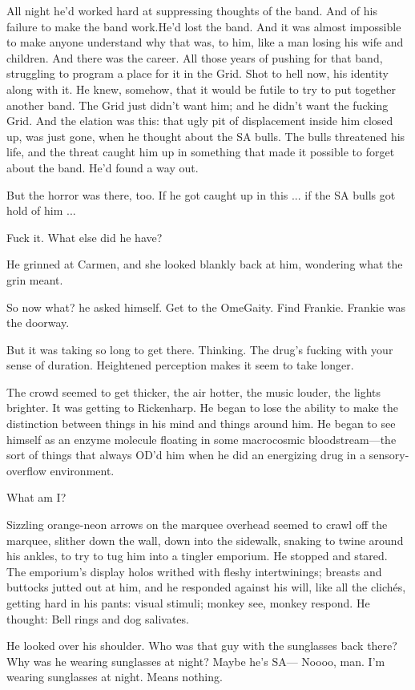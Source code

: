 All night he'd worked hard at suppressing thoughts of the band. And of his failure to make the band work.He'd lost the band. And it was almost impossible to make anyone understand why that was, to him, like a man losing his wife and children. And there was the career. All those years of pushing for that band, struggling to program a place for it in the Grid. Shot to hell now, his identity along with it. He knew, somehow, that it would be futile to try to put together another band. The Grid just didn't want him; and he didn't want the fucking Grid. And the elation was this: that ugly pit of displacement inside him closed up, was just gone, when he thought about the SA bulls. The bulls threatened his life, and the threat caught him up in something that made it possible to forget about the band. He'd found a way out.

But the horror was there, too. If he got caught up in this ... if the SA bulls got hold of him ...

Fuck it. What else did he have?

He grinned at Carmen, and she looked blankly back at him, wondering what the grin meant.

So now what? he asked himself. Get to the OmeGaity. Find Frankie. Frankie was the doorway.

But it was taking so long to get there. Thinking. The drug's fucking with your sense of duration. Heightened perception makes it seem to take longer.

The crowd seemed to get thicker, the air hotter, the music louder, the lights brighter. It was getting to Rickenharp. He began to lose the ability to make the distinction between things in his mind and things around him. He began to see himself as an enzyme molecule floating in some macrocosmic bloodstream—the sort of things that always OD'd him when he did an energizing drug in a sensory-overflow environment.

What am I?

Sizzling orange-neon arrows on the marquee overhead seemed to crawl off the marquee, slither down the wall, down into the sidewalk, snaking to twine around his ankles, to try to tug him into a tingler emporium. He stopped and stared. The emporium's display holos writhed with fleshy intertwinings; breasts and buttocks jutted out at him, and he responded against his will, like all the clichés, getting hard in his pants: visual stimuli; monkey see, monkey respond. He thought: Bell rings and dog salivates.

He looked over his shoulder. Who was that guy with the sunglasses back there? Why was he wearing sunglasses at night? Maybe he's SA— Noooo, man. I'm wearing sunglasses at night. Means nothing.

